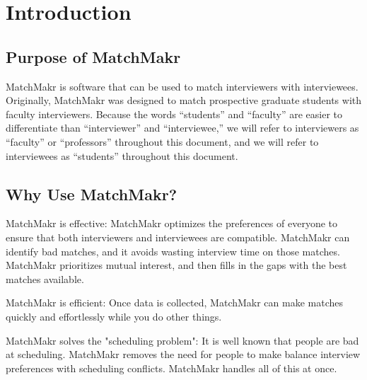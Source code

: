 

\chapter{Introduction}

\section{Purpose of MatchMakr}
MatchMakr is software that can be used to match interviewers with interviewees.  Originally, MatchMakr was designed to match prospective graduate students with faculty interviewers.  Because the words ``students'' and ``faculty'' are easier to differentiate than ``interviewer'' and ``interviewee,'' we will refer to interviewers as ``faculty'' or ``professors'' throughout this document, and we will refer to interviewees as ``students'' throughout this document.

\section{Why Use MatchMakr?}
\par
MatchMakr is effective: 
MatchMakr optimizes the preferences of everyone to ensure that both interviewers and interviewees are compatible.  MatchMakr can identify bad matches, and it avoids wasting interview time on those matches.  MatchMakr prioritizes mutual interest, and then fills in the gaps with the best matches available.

\par
MatchMakr is efficient:
Once data is collected, MatchMakr can make matches quickly and effortlessly while you do other things.

\par
MatchMakr solves the "scheduling problem":
It is well known that people are bad at scheduling.  MatchMakr removes the need for people to make balance interview preferences with scheduling conflicts.  MatchMakr handles all of this at once.